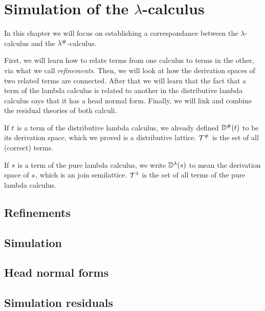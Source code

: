 
\chapter{Simulation of the $\lambda$-calculus}

In this chapter we will focus on establishing a correspondance between
the $\lambda$-calculus and the $\lambda^{\mathtt{\#}}$-calculus.

First, we will learn how to relate terms from one calculus to terms in the other,
via what we call \emph{refinements}.
Then, we will look at how the derivation spaces of two related terms are connected.
After that we will learn that the fact that a term of the lambda calculus is
related to another in the distributive lambda calculus
says that it has a head normal form.
Finally, we will link and combine the residual theories of both calculi.


\begin{notation}
If $t$ is a term of the distributive lambda calculus,
we already defined $\mathbb{D}^{\mathtt{\#}}(t)$ to be its derivation space,
which we proved is a distributive lattice.
$\mathcal{T}^{\mathtt{\#}}$ is the set of all (correct) terms.

If $s$ is a term of the pure lambda calculus,
we write $\mathbb{D}^{\lambda}(s)$ to mean
the derivation space of $s$, which
is an join semilattice.
$\mathcal{T}^{\lambda}$ is the set of all terms of the pure lambda calculus.
\end{notation}


\section{Refinements}


\section{Simulation}


\section{Head normal forms}


\section{Simulation residuals}

